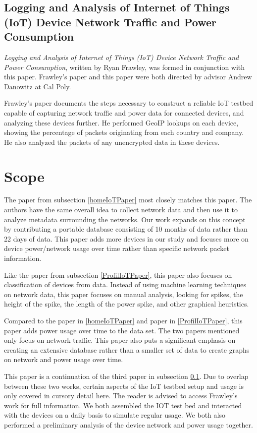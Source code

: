 \subsection{Logging and Analysis of Internet of Things (IoT) Device Network Traffic and Power Consumption}
\label{frawleyPaper}
\textit{Logging and Analysis of Internet of Things (IoT) Device Network Traffic and Power Consumption}\cite{frawley_2018}, written by Ryan Frawley, was formed in conjunction with this paper. Frawley's paper and this paper were both directed by advisor Andrew Danowitz at Cal Poly.

Frawley's paper documents the steps necessary to construct a reliable IoT testbed capable of capturing network traffic and power data for connected devices, and analyzing these devices further. He performed GeoIP\cite{maxmind} lookups on each device, showing the percentage of packets originating from each country and company. He also analyzed the packets of any unencrypted data in these devices.

\section{Scope}
\label{Scope}
The paper from subsection \ref{homeIoTPaper} most closely matches this paper. The authors have the same overall idea to collect network data and then use it to analyze metadata surrounding the networks. Our work expands on this concept by contributing a portable database consisting of 10 months of data rather than 22 days of data. This paper adds more devices in our study and focuses more on device power/network usage over time rather than specific network packet information.

Like the paper from subsection \ref{ProfilIoTPaper}, this paper also focuses on classification of devices from data. Instead of using machine learning techniques on network data, this paper focuses on manual analysis, looking for spikes, the height of the spike, the length of the power spike, and other graphical heuristics.

Compared to the paper in \ref{homeIoTPaper} and paper in \ref{ProfilIoTPaper}, this paper adds power usage over time to the data set. The two papers mentioned only focus on network traffic. This paper also puts a significant emphasis on creating an extensive database rather than a smaller set of data to create graphs on network and power usage over time.

This paper is a continuation of the third paper in subsection \ref{frawleyPaper}. Due to overlap between these two works, certain aspects of the IoT testbed setup and usage is only covered in cursory detail here. The reader is advised to access Frawley's work for full information. We both assembled the IOT test bed and interacted with the devices on a daily basis to simulate regular usage. We both also performed a preliminary analysis of the device network and power usage together.

